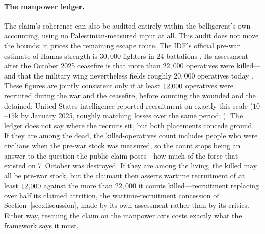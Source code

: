 \paragraph{The manpower ledger.} The claim's coherence can also be audited entirely within the belligerent's own accounting, using no Palestinian-measured input at all. This audit does not move the bounds; it prices the remaining escape route. The IDF's official pre-war estimate of Hamas strength is $30{,}000$ fighters in 24 battalions \citep{jpostbattalions2024}. Its assessment after the October 2025 ceasefire is that more than $22{,}000$ operatives were killed---and that the military wing nevertheless fields roughly $20{,}000$ operatives today \citep{iticledger2026}. These figures are jointly consistent only if at least $12{,}000{}$ operatives were recruited during the war and the ceasefire, before counting the wounded and the detained; United States intelligence reported recruitment on exactly this scale ($10$--$15$k by January 2025, roughly matching losses over the same period; \citealp{reutersrecruit2025}). The ledger does not say where the recruits sit, but both placements concede ground. If they are among the dead, the killed-operatives count includes people who were civilians when the pre-war stock was measured, so the count stops being an answer to the question the public claim poses---how much of the force that existed on 7~October was destroyed. If they are among the living, the killed may all be pre-war stock, but the claimant then asserts wartime recruitment of at least $12{,}000{}$ against the more than $22{,}000$ it counts killed---recruitment replacing over half its claimed attrition, the wartime-recruitment concession of Section~\ref{sec:discussion}, made by its own assessment rather than by its critics. Either way, rescuing the claim on the manpower axis costs exactly what the framework says it must.


